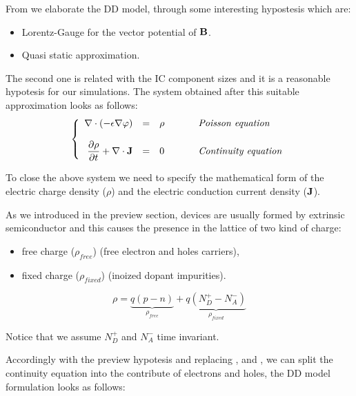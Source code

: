 From  we elaborate the DD model, through some interesting hypostesis which are:
\begin{itemize}
\item Lorentz-Gauge for the vector potential of $\mathbf{B}$.
\item Quasi static approximation.
\end{itemize}

The second one is related with the IC component sizes and it is a reasonable hypotesis for our simulations.	
The system obtained after this suitable approximation looks as follows:
\begin{equation}
\left\{
\begin{array}{rcll}
\nabla \cdot (-\epsilon \nabla \varphi) & = & \rho &\psp{15} \textit{Poisson equation}\\ \\
\dfrac{\partial \rho}{\partial t} + \nabla \cdot \vect{J} & = & 0 &\psp{15} \textit{Continuity equation}\\
\end{array}
\right.
\end{equation} 




To close the above system we need to specify the mathematical form of the electric charge density ($\rho$) and the electric conduction current density ($\mathbf{J}$).

As we introduced in the preview section, devices are usually formed by extrinsic semiconductor and this causes the presence in the lattice of two kind of charge:
\begin{itemize}
\item free charge ($\rho_{free}$) (free electron and holes carriers),
\item fixed charge ($\rho_{fixed}$) (inoized dopant impurities).
\end{itemize} 

\begin{equation}
\label{eq: charge balance}
\rho = \underbrace{q(p-n)}_{\rho_{free}} +\underbrace{q(N_D^+-N_A^-)}_{\rho_{fixed}}
\end{equation}

 Notice that we assume $N_D^+$ and $N_A^-$ time invariant.

 Accordingly with the preview hypotesis and replacing ,  and , we can split the continuity equation into the contribute of electrons and holes, the DD model formulation looks as follows:
 
